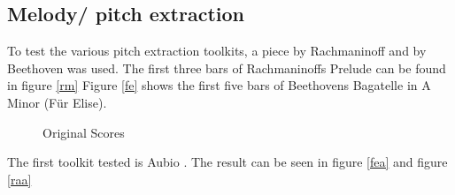 \subsection{Melody/ pitch extraction}\label{midiest}
To test the various pitch extraction toolkits, a piece by Rachmaninoff and by Beethoven was used. The first three bars of Rachmaninoffs Prelude can be found in figure \ref{rm}
Figure \ref{fe} shows the first five bars of Beethovens Bagatelle in A Minor (Für Elise).
\begin{figure}[htbp]
	\centering
	\caption{Original Scores}
	\label{fig:sheets}
\end{figure}
The first toolkit tested is Aubio \cite{aubio1}. The result can be seen in figure \ref{fea} and figure \ref{raa}
